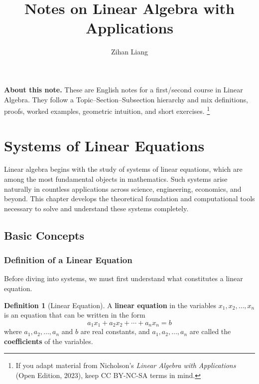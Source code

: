 \documentclass[12pt]{article}
\title{Notes on Linear Algebra with Applications}
\author{Zihan Liang}
\numberwithin{equation}{section}
\theoremstyle{plain}
\theoremstyle{definition}
\newtheorem{definition}[theorem]{Definition}
\theoremstyle{remark}
\begin{document}
\maketitle

\noindent\textbf{About this note.}
These are English notes for a first/second course in Linear Algebra.
They follow a Topic--Section--Subsection hierarchy and mix definitions, proofs, worked examples, geometric intuition, and short exercises.%
\footnote{If you adapt material from Nicholson's \emph{Linear Algebra with Applications} (Open Edition, 2023), keep CC BY-NC-SA terms in mind.}

\tableofcontents
\newpage

\section{Systems of Linear Equations}

Linear algebra begins with the study of systems of linear equations, which are among the most fundamental objects in mathematics. Such systems arise naturally in countless applications across science, engineering, economics, and beyond. This chapter develops the theoretical foundation and computational tools necessary to solve and understand these systems completely.

\subsection{Basic Concepts}

\subsubsection{Definition of a Linear Equation}

Before diving into systems, we must first understand what constitutes a linear equation.

\begin{definition}[Linear Equation]
A \textbf{linear equation} in the variables $x_1, x_2, \ldots, x_n$ is an equation that can be written in the form
\begin{equation}
a_1 x_1 + a_2 x_2 + \cdots + a_n x_n = b
\end{equation}
where $a_1, a_2, \ldots, a_n$ and $b$ are real constants, and $a_1, a_2, \ldots, a_n$ are called the \textbf{coefficients} of the variables.
\end{definition}
\end{document}
